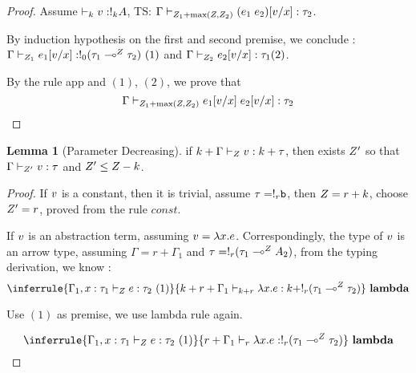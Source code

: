 \documentclass[a4paper,11pt]{article}
\theoremstyle{definition}
\newtheorem{lem}[thm]{Lemma}
\begin{document}
\begin{proof}
      
  
  Assume $\empty \tvdash{k} \valr : \bang{k} \ltype$, TS: $\Gamma
  \vdash_{ Z_1+ \max(Z,Z_2)  } (e_1 \;
  e_2)[v/x]  : \tau_2$.
  
By induction hypothesis on the first and second premise, we conclude
: $ \Gamma \vdash_{Z_1}  e_1[v/x]  :  !_{0}
( \tau_1 \multimap^{Z} \tau_2 )~(1)$ and $  \Gamma \vdash_{Z_2} e_2[v/x]: \tau_1(2)$.

 By the rule app and $(1)$, $(2)$,  we prove that $$ \Gamma
  \vdash_{  Z_1 + \max(Z, Z_2)  }  e_1[v/x] \;
  e_2[v/x]  : \tau_2$$

\end{proof}

\begin{lem}[Parameter Decreasing]
  \label{para-dec}
  if  $k+\Gamma \vdash_{Z} v : k+ \tau  $, then exists 
  $Z'$ so
  that   $\Gamma \vdash_{Z' } v :
  \tau$ and  $Z' \leq Z-k $.
\end{lem}
\begin{proof}
  
  If $v$ is a constant, then it is trivial, assume $\tau =
  !_{r} \mathtt{b}$, then $Z = r+k$,  choose
  $Z' = r$, proved from the rule $const$.
  
  If $v$ is an abstraction term, assuming $v = \lambda
  x. e$. Correspondingly, the type of $v$ is an arrow type,
  assuming $\Gamma = r+ \Gamma_1 $ and   $\tau =!_{r} (\tau_1
  \multimap^{Z} A_2)$, from the typing derivation, we know : 
  \[
  \inferrule{
      \ictx \Gamma_1, x: \type_1
      \tvdash{\nnatA }
      \expr: \type_2  ~(1)
    }{
      \ictx k+r+\Gamma_1  \tvdash{k+r} \lambda x. \expr : k + \bang{r}  ( \type_1
      \lto^{\nnatA} \type_2)
    }~\textbf{lambda}
\]

Use $(1)$ as premise, we use lambda rule again.

 \[
  \inferrule{
      \ictx \Gamma_1, x: \type_1
      \tvdash{\nnatA }
      \expr: \type_2  ~(1)
    }{
      \ictx r+\Gamma_1  \tvdash{r} \lambda x. \expr :  \bang{r}  ( \type_1
      \lto^{\nnatA} \type_2)
    }~\textbf{lambda}
\]

\end{proof}
\end{document}
